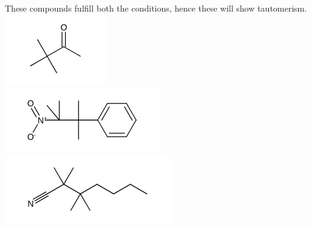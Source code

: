 \documentclass[10pt]{article}
\begin{document}
These compounds fulfill both the conditions, hence these will show tautomerism.\\
\includegraphics{smile-0011d58c4450ec958d84dedff3a03715c15ed447}\\
\includegraphics{smile-7d6ffbbf24527a1e2a8beb5ce131d2b0815261d3}\\
\includegraphics{smile-278b6b873ab02e41ec314c52b78923b128bd36fb}
\end{document}
